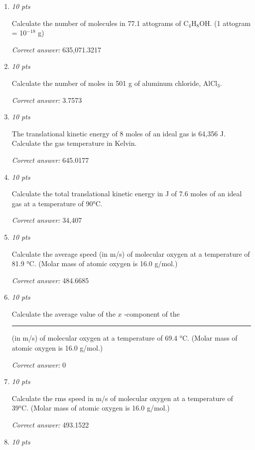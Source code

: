 \documentclass[11pt]{article}
\begin{document}
\begin{enumerate}[leftmargin=*,label=\textbf{Question \arabic*.}]
\emph{p}$_{gauge}$ = \rule{2.5cm}{0.4pt} psi

\textit{Correct answer:} 29.4134

\item \hfill \textit{10 pts}

Calculate the number of molecules in 77.1 attograms of C$_{4}$H$_{8}$OH. (1 attogram = 10$^{-18}$ g)

\textit{Correct answer:} 635,071.3217

\item \hfill \textit{10 pts}

Calculate the number of moles in 501 g of aluminum chloride, AlCl$_{3}$.

\textit{Correct answer:} 3.7573

\item \hfill \textit{10 pts}

The translational kinetic energy of 8 moles of an ideal gas is 64,356 J. Calculate the gas temperature in Kelvin.

\textit{Correct answer:} 645.0177

\item \hfill \textit{10 pts}

Calculate the total translational kinetic energy in J of 7.6 moles of an ideal gas at a temperature of 90°C.

\textit{Correct answer:} 34,407

\item \hfill \textit{10 pts}

Calculate the average speed (in m/s) of molecular oxygen at a temperature of 81.9 °C. (Molar mass of atomic oxygen is 16.0 g/mol.)

\textit{Correct answer:} 484.6685

\item \hfill \textit{10 pts}

Calculate the average value of the  $x$ -component of the \rule{2.5cm}{0.4pt} (in m/s) of molecular oxygen at a temperature of 69.4 °C. (Molar mass of atomic oxygen is 16.0 g/mol.)

\textit{Correct answer:} 0

\item \hfill \textit{10 pts}

Calculate the rms speed in m/s of molecular oxygen at a temperature of 39°C. (Molar mass of atomic oxygen is 16.0 g/mol.)

\textit{Correct answer:} 493.1522

\item \hfill \textit{10 pts}


\end{enumerate}
\end{document}
